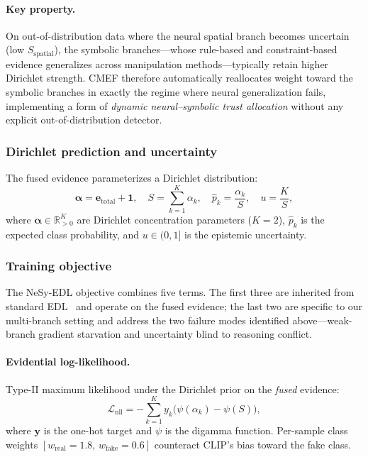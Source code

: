 \documentclass{article}
\begin{document}
\paragraph{Key property.}
On out-of-distribution data where the neural spatial branch becomes uncertain (low $S_\text{spatial}$), the symbolic branches---whose rule-based and constraint-based evidence generalizes across manipulation methods---typically retain higher Dirichlet strength. CMEF therefore automatically reallocates weight toward the symbolic branches in exactly the regime where neural generalization fails, implementing a form of \emph{dynamic neural--symbolic trust allocation} without any explicit out-of-distribution detector.


\subsubsection{Dirichlet prediction and uncertainty}

The fused evidence parameterizes a Dirichlet distribution:
\begin{equation}
  \bm{\alpha} = \bm{e}_\text{total} + \bm{1}, \quad
  S = \textstyle\sum_{k=1}^{K}\alpha_k, \quad
  \hat{p}_k = \frac{\alpha_k}{S}, \quad
  u = \frac{K}{S},
  \label{eq:dirichlet}
\end{equation}
where $\bm{\alpha} \in \mathbb{R}^K_{>0}$ are Dirichlet concentration parameters ($K{=}2$), $\hat{p}_k$ is the expected class probability, and $u \in (0, 1]$ is the epistemic uncertainty.


\subsubsection{Training objective}
\label{sec:loss}

The NeSy-EDL objective combines five terms. The first three are inherited from standard EDL~\citep{sensoy2018evidential,karandikar2021soft} and operate on the fused evidence; the last two are specific to our multi-branch setting and address the two failure modes identified above---weak-branch gradient starvation and uncertainty blind to reasoning conflict.

\paragraph{Evidential log-likelihood.}
Type-II maximum likelihood under the Dirichlet prior on the \emph{fused} evidence:
\begin{equation}
  \mathcal{L}_\text{nll} = -\sum_{k=1}^{K} y_k\bigl(\psi(\alpha_k) - \psi(S)\bigr),
  \label{eq:edl_nll}
\end{equation}
where $\bm{y}$ is the one-hot target and $\psi$ is the digamma function.
Per-sample class weights $[w_\text{real}{=}1.8,\, w_\text{fake}{=}0.6]$ counteract CLIP's bias toward the fake class.
\end{document}
